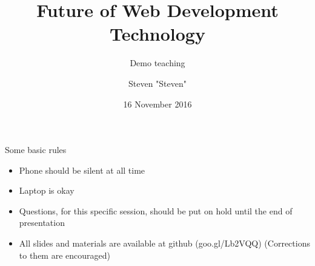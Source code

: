 \documentclass{beamer}
\title{Future of Web Development Technology}
\subtitle{Demo teaching}
\date{16 November 2016}
\author{Steven "Steven"}
\institute{BINUS INTERNATIONAL}
\begin{document}
  \maketitle
  
  \begin{frame}{Some basic rules}
  	\begin{itemize}
		\item Phone should be silent at all time
		\item Laptop is okay
		\item Questions, for this specific session, should be put on hold until the end of presentation
		\item All slides and materials are available at github (goo.gl/Lb2VQQ) (Corrections to them are encouraged)
	\end{itemize}
  \end{frame}
  
\end{document}
